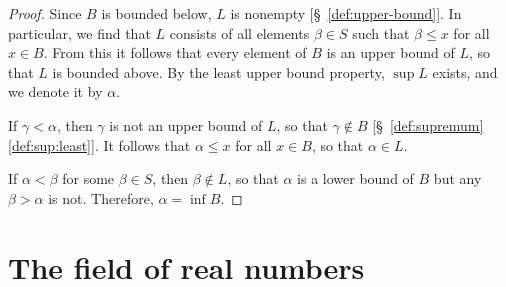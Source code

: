 \begin{proof}
    Since \(B\) is bounded below, \(L\) is nonempty [\S~\ref{def:upper-bound}]. In particular, we find that \(L\) consists of all elements \(\beta \in S\) such that \(\beta \leq x\) for all \(x \in B\). From this it follows that every element of \(B\) is an upper bound of \(L\), so that \(L\) is bounded above. By the least upper bound property, \(\sup L\) exists, and we denote it by \(\alpha\).

    If \(\gamma < \alpha\), then \(\gamma\) is not an upper bound of \(L\), so that \(\gamma \notin B\) [\S~\ref{def:supremum}\ref{def:sup:least}]. It follows that \(\alpha \leq x\) for all \(x \in B\), so that \(\alpha \in L\).

    If \(\alpha < \beta\) for some \(\beta \in S\), then \(\beta \notin L\), so that \(\alpha\) is a lower bound of \(B\) but any \(\beta > \alpha\) is not. Therefore, \(\alpha = \inf B\).
\end{proof}

\section*{The field of real numbers}

